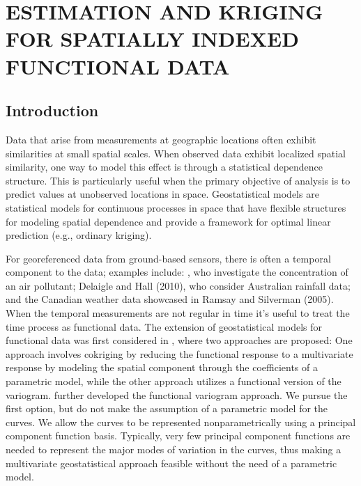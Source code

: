 

\chapter{ESTIMATION AND KRIGING FOR SPATIALLY INDEXED FUNCTIONAL DATA} 
\label{ch:functional kriging}

\section{Introduction} 

\label{sec:introduction}
Data that arise from measurements at geographic locations often exhibit similarities at small spatial scales. When observed data exhibit localized spatial similarity, one way to model this effect is through a statistical dependence structure. This is particularly useful when the primary objective of analysis is to predict values at unobserved locations in space. Geostatistical models are statistical models for continuous processes in space that have flexible structures for modeling spatial dependence and provide a framework for optimal linear prediction (e.g., ordinary kriging). 

For georeferenced data from ground-based sensors, there is often a temporal component to the data; examples include: \cite{Kaiser:2002wna}, who investigate the concentration of an air pollutant; Delaigle and Hall (2010), who consider Australian rainfall data; and the Canadian weather data showcased in Ramsay and Silverman (2005). When the temporal measurements are not regular in time it's useful to treat the time process as functional data. The extension of geostatistical models for functional data was first considered in \cite{Goulard:1993}, where two approaches are proposed: One approach involves cokriging by reducing the functional response to a multivariate response by modeling the spatial component through the coefficients of a parametric model, while the other approach utilizes a functional version of the variogram.  \cite{Giraldo:2010jx} further developed the functional variogram approach. We pursue the first option, but do not make the assumption of a parametric model for the curves. We allow the curves to be represented nonparametrically using a principal component function basis. Typically, very few principal component functions are needed to represent the major modes of variation in the curves, thus making a multivariate geostatistical approach feasible without the need of a parametric model. 

